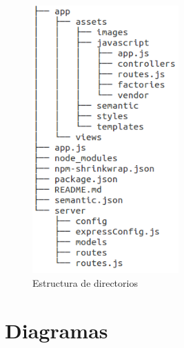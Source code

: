 \begin{figure}[htbp] 
    \centering
    \includegraphics[width=0.5\textwidth]{figuras/directorios.png}
    \caption{Estructura de directorios}
    \label{fig:directorios}
\end{figure}	

\section{Diagramas}

